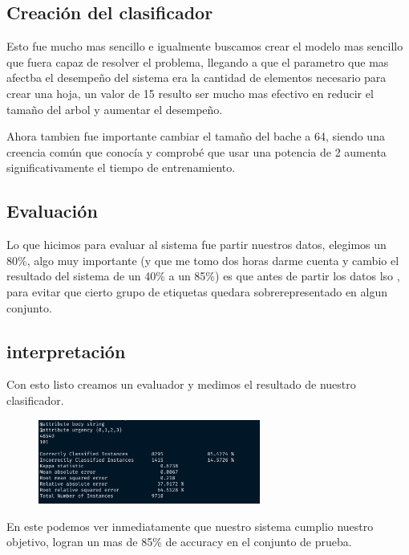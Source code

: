 \documentclass[12pt, fleqn]{report}                             %
\newcommand \Quote              {\qq}                           %
\theoremstyle{break}                                            %
\begin{document}
        \subsection{Creación del clasificador}

        Esto fue mucho mas sencillo e igualmente buscamos crear el modelo mas sencillo que fuera capaz de resolver el problema, llegando
        a que el parametro que mas afectba el desempeño del sistema era la cantidad de elementos necesario para crear una hoja,
        un valor de 15 resulto ser mucho mas efectivo en reducir el tamaño del arbol y aumentar el desempeño.

        Ahora tambien fue importante cambiar el tamaño del bache a 64, siendo una creencia común que conocía y comprobé que usar 
        una potencia de 2 aumenta significativamente el tiempo de entrenamiento.

        \subsection{Evaluación}

        Lo que hicimos para evaluar al sistema fue partir nuestros datos, elegimos un 80\%, algo muy importante (y que me tomo dos horas
        darme cuenta y cambio el resultado del sistema de un 40\% a un 85\%) es que antes de partir los datos lso \Quote{revolvimos},
        para evitar que cierto grupo de etiquetas quedara sobrerepresentado en algun conjunto.

        \subsection{interpretación}

        Con esto listo creamos un evaluador y medimos el resultado de nuestro clasificador.
        \begin{figure}[h!]
            \centering
            \includegraphics[width=0.65\textwidth]{result}
        \end{figure}

        En este podemos ver inmediatamente que nuestro sistema cumplio nuestro objetivo, 
        logran un mas de 85\% de accuracy en el conjunto de prueba.
\end{document}
